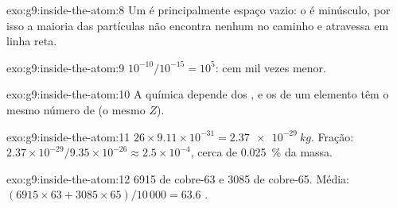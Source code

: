 \begin{solution}{exo:g9:inside-the-atom:8}
Um  é principalmente espaço vazio: o  é minúsculo, por isso a
maioria das partículas não encontra nenhum  no caminho e atravessa
em linha reta.
\end{solution}

\begin{solution}{exo:g9:inside-the-atom:9}
$10^{-10} / 10^{-15} = 10^{5}$: cem mil vezes menor.
\end{solution}

\begin{solution}{exo:g9:inside-the-atom:10}
A química depende dos , e os  de um elemento têm o mesmo
número de  (o mesmo $Z$).
\end{solution}

\begin{solution}{exo:g9:inside-the-atom:11}
$26 \times 9.11 \times 10^{-31} = \qty{2.37e-29}{kg}$. Fração:
$2.37 \times 10^{-29} / 9.35 \times 10^{-26} \approx 2.5 \times
10^{-4}$, cerca de \qty{0.025}{\percent} da massa.
\end{solution}

\begin{solution}{exo:g9:inside-the-atom:12}
6915  de cobre-63 e 3085  de cobre-65. Média:
$(6915 \times 63 + 3085 \times 65)/10\,000 = 63.6$ .
\end{solution}

